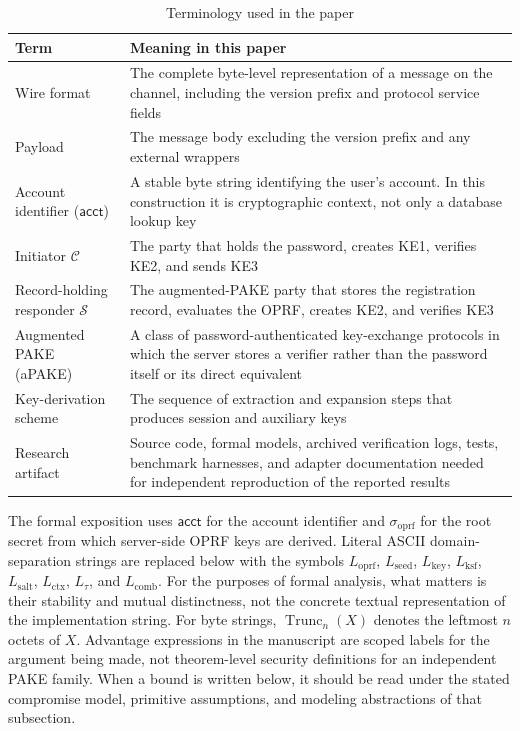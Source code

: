 \documentclass[preprint,12pt]{elsarticle}
\newcommand{\acct}{\mathsf{acct}}
\newcommand{\sigoprf}{\sigma_{\mathrm{oprf}}}
\newcommand{\Label}[1]{L_{\mathrm{#1}}}
\theoremstyle{remark}
\begin{document}
\begin{table}[htbp]
\caption{Terminology used in the paper}
\label{tab:terminology}
\centering\small
\begin{tabularx}{\textwidth}{@{}L{3.2cm}X@{}}
\toprule
Term & Meaning in this paper \\
\midrule
Wire format & The complete byte-level representation of a message on the channel, including the version prefix and protocol service fields \\
Payload & The message body excluding the version prefix and any external wrappers \\
Account identifier ($\acct$) & A stable byte string identifying the user's account. In this construction it is cryptographic context, not only a database lookup key \\
Initiator $\mathcal{C}$ & The party that holds the password, creates KE1, verifies KE2, and sends KE3 \\
Record-holding responder $\mathcal{S}$ & The augmented-PAKE party that stores the registration record, evaluates the OPRF, creates KE2, and verifies KE3 \\
Augmented PAKE (aPAKE) & A class of password-authenticated key-exchange protocols in which the server stores a verifier rather than the password itself or its direct equivalent \\
Key-derivation scheme & The sequence of extraction and expansion steps that produces session and auxiliary keys \\
Research artifact & Source code, formal models, archived verification logs, tests, benchmark harnesses, and adapter documentation needed for independent reproduction of the reported results \\
\bottomrule
\end{tabularx}
\end{table}

The formal exposition uses $\acct$ for the account identifier and $\sigoprf$ for the root secret from which server-side OPRF keys are derived. Literal ASCII domain-separation strings are replaced below with the symbols $\Label{oprf}$, $\Label{seed}$, $\Label{key}$, $\Label{ksf}$, $\Label{salt}$, $\Label{ctx}$, $L_{\tau}$, and $\Label{comb}$. For the purposes of formal analysis, what matters is their stability and mutual distinctness, not the concrete textual representation of the implementation string. For byte strings, $\operatorname{Trunc}_n(X)$ denotes the leftmost $n$ octets of $X$. Advantage expressions in the manuscript are scoped labels for the argument being made, not theorem-level security definitions for an independent PAKE family. When a bound is written below, it should be read under the stated compromise model, primitive assumptions, and modeling abstractions of that subsection.
\end{document}
